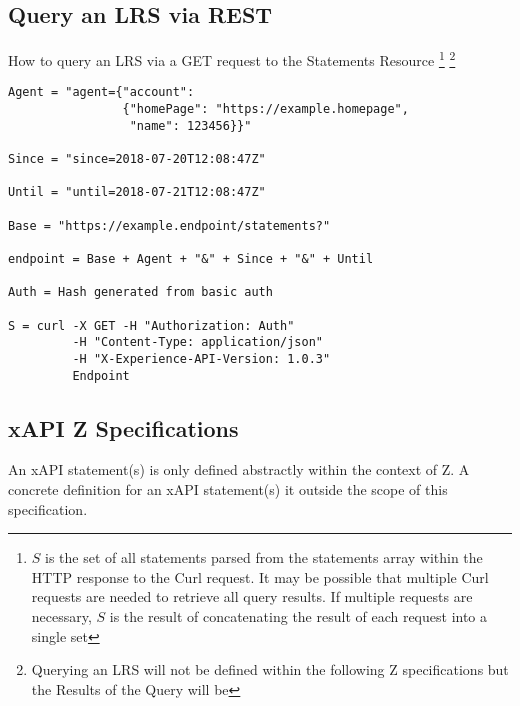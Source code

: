 \documentclass{article}
\begin{document}
  \subsection{Query an LRS via REST}
  How to query an LRS via a GET request to the Statements Resource
  \footnote{\label{moreLink} $S$ is the set of all statements parsed
    from the statements array within the HTTP response to the Curl
    request. It may be possible that multiple Curl requests are needed
    to retrieve all query results. If multiple requests are necessary,
    $S$ is the result of concatenating the result of each request into
    a single set}
  \footnote{\label{noZ} Querying an LRS will not be defined within the
  following Z specifications but the Results of the Query will be}
  \begin{lstlisting}[frame=single]
Agent = "agent={"account":
                {"homePage": "https://example.homepage",
                 "name": 123456}}"

Since = "since=2018-07-20T12:08:47Z"

Until = "until=2018-07-21T12:08:47Z"

Base = "https://example.endpoint/statements?"

endpoint = Base + Agent + "&" + Since + "&" + Until

Auth = Hash generated from basic auth

S = curl -X GET -H "Authorization: Auth"
         -H "Content-Type: application/json"
         -H "X-Experience-API-Version: 1.0.3"
         Endpoint
  \end{lstlisting}

  \subsection{xAPI Z Specifications}

  An xAPI statement(s) is only defined abstractly within the context
  of Z. A concrete definition for an xAPI statement(s) it outside the
  scope of this specification.
\end{document}
